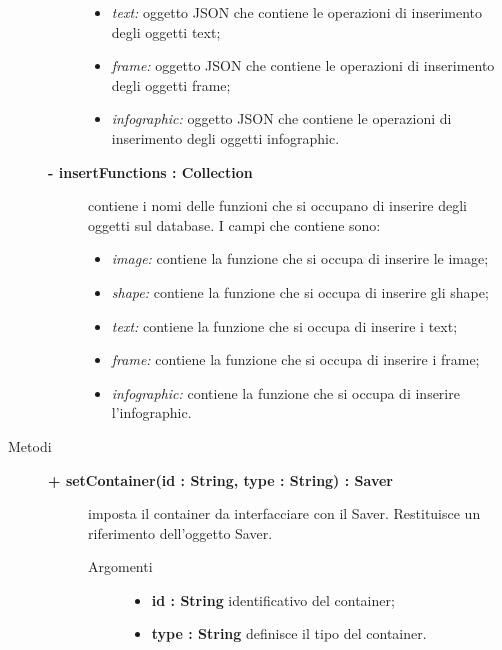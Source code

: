 \begin{description}
\begin{description}
\begin{itemize}
				\item \textit{text:} oggetto JSON che contiene le operazioni di inserimento degli oggetti text;
				\item \textit{frame:} oggetto JSON che contiene le operazioni di inserimento degli oggetti frame;
				\item \textit{infographic:} oggetto JSON che contiene le operazioni di inserimento degli oggetti infographic.
			\end{itemize}
			\item[\textbf{- insertFunctions : Collection			}] \hfill
			contiene i nomi delle funzioni che si occupano di inserire degli oggetti sul database. I campi che contiene sono:
			\begin{itemize}
				\item \textit{image:} contiene la funzione che si occupa di inserire le image;
				\item \textit{shape:} contiene la funzione che si occupa di inserire gli shape;
				\item \textit{text:} contiene la funzione che si occupa di inserire i text;
				\item \textit{frame:} contiene la funzione che si occupa di inserire i frame;
				\item \textit{infographic:} contiene la funzione che si occupa di inserire l'infographic.
			\end{itemize}		
		
	\end{description}
	
	
\item[Metodi] \hfill

	\begin{description}
		\item[\textbf{\color{blue}+ setContainer(id : String, type : String) : Saver			}] \hfill
			imposta il container da interfacciare con il Saver. Restituisce un riferimento dell'oggetto Saver.
			
		\begin{description}
			\item[Argomenti] \hfill
				\begin{itemize}
				
					\item \textbf{id : String			} \hfill
					identificativo del container;
					\item \textbf{type : String			} \hfill
					definisce il tipo del container.
				\end{itemize}
		\end{description}
	\end{description}	


\end{description}

